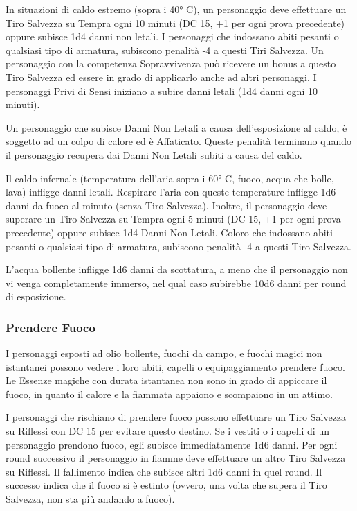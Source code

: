 \documentclass[a4paper,11pt,twoside,openany]{book}
\begin{document}
In situazioni di caldo estremo (sopra i 40° C), un personaggio deve effettuare un Tiro Salvezza su Tempra ogni 10 minuti (DC 15, +1 per ogni prova precedente) oppure subisce 1d4 danni non letali. I personaggi che indossano abiti pesanti o qualsiasi tipo di armatura, subiscono penalità -4 a questi Tiri Salvezza. Un personaggio con la competenza Sopravvivenza può ricevere un bonus a questo Tiro Salvezza ed essere in grado di applicarlo anche ad altri personaggi. I personaggi Privi di Sensi iniziano a subire danni letali (1d4 danni ogni 10 minuti).

Un personaggio che subisce Danni Non Letali a causa dell'esposizione al caldo, è soggetto ad un colpo di calore ed è Affaticato. Queste penalità terminano quando il personaggio recupera dai Danni Non Letali subiti a causa del caldo.

Il caldo infernale (temperatura dell'aria sopra i 60° C, fuoco, acqua che bolle, lava) infligge danni letali. Respirare l'aria con queste temperature infligge 1d6 danni da fuoco al minuto (senza Tiro Salvezza).
Inoltre, il personaggio deve superare un Tiro Salvezza su Tempra ogni 5 minuti (DC 15, +1 per ogni prova precedente) oppure subisce 1d4 Danni Non Letali. Coloro che indossano abiti pesanti o qualsiasi tipo di armatura, subiscono penalità -4 a questi Tiro Salvezza.

L'acqua bollente infligge 1d6 danni da scottatura, a meno che il personaggio non vi venga completamente immerso, nel qual caso subirebbe 10d6 danni per round di esposizione.

\subsubsection{Prendere Fuoco}

\label{prendere-fuoco}

I personaggi esposti ad olio bollente, fuochi da campo, e fuochi magici non istantanei possono vedere i loro abiti, capelli o equipaggiamento prendere fuoco. Le Essenze magiche con durata istantanea non sono in grado di appiccare il fuoco, in quanto il calore e la fiammata appaiono e scompaiono in un attimo.

I personaggi che rischiano di prendere fuoco possono effettuare un Tiro Salvezza su Riflessi con DC 15 per evitare questo destino. Se i vestiti o i capelli di un personaggio prendono fuoco, egli subisce immediatamente 1d6 danni. Per ogni round successivo il personaggio in fiamme deve effettuare un altro Tiro Salvezza su Riflessi. Il fallimento indica che subisce altri 1d6 danni in quel round. Il successo indica che il fuoco si è estinto (ovvero, una volta che supera il Tiro Salvezza, non sta più andando a fuoco).
\end{document}
